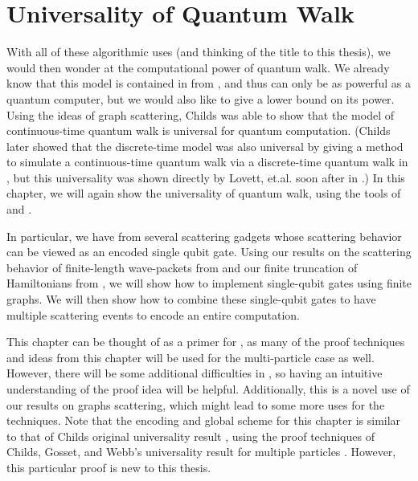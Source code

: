 \documentclass[../thesis-main/thesis-main]{subfiles}
\begin{document}
\chapter{Universality of Quantum Walk}
\label{chap:SP_universality}




With all of these algorithmic uses (and thinking of the title to this thesis), we would then wonder at the computational power of quantum walk.   We already know that this model is contained in \BQP from , and thus can only be as powerful as a quantum computer, but we would also like to give a lower bound on its power.  Using the ideas of graph scattering, Childs \cite{Chi09} was able to show that the model of continuous-time quantum walk is universal for quantum computation. (Childs later showed that the discrete-time model was also universal by giving a method to simulate a continuous-time quantum walk via a discrete-time quantum walk in \cite{Chi10}, but this universality was shown directly by Lovett, et.al. soon after in \cite{LCETK10}.)  In this chapter, we will again show the universality of quantum walk, using the tools of  and .  

In particular, we have from  several scattering gadgets whose scattering behavior can be viewed as an encoded single qubit gate.  Using our results on the scattering behavior of finite-length wave-packets from  and our finite truncation of Hamiltonians from , we will show how to implement single-qubit gates using finite graphs.  We will then show how to combine these single-qubit gates to have multiple scattering events to encode an entire computation.

This chapter can be thought of as a primer for , as many of the proof techniques and ideas from this chapter will be used for the multi-particle case as well.  However, there will be some additional difficulties in , so having an intuitive understanding of the proof idea will be helpful.  Additionally, this is a novel use of our results on graphs scattering, which might lead to some more uses for the techniques.  Note that the encoding and global scheme for this chapter is similar to that of Childs original universality result \cite{Chi09}, using the proof techniques of Childs, Gosset, and Webb's universality result for multiple particles \cite{MPQW}.  However, this particular proof is new to this thesis.
\end{document}
